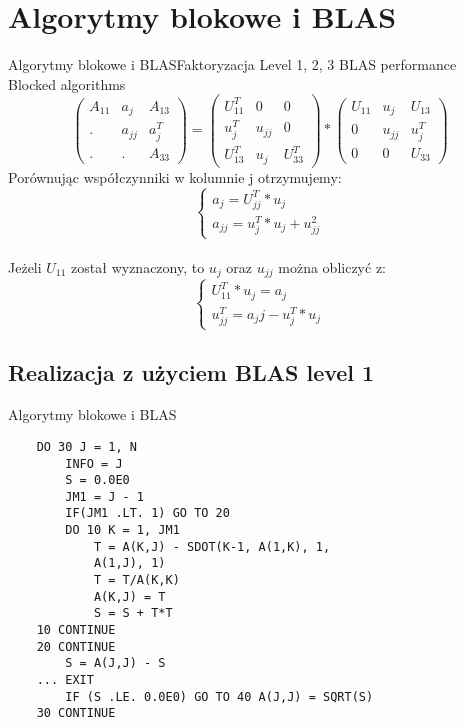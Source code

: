 \section{Algorytmy blokowe i BLAS}
	\begin{frame}{Algorytmy blokowe i BLAS}{Faktoryzacja}
		Level 1, 2, 3 BLAS performance \\
		Blocked algorithms \\
		$$
		\begin{pmatrix}
		A_{11} & a_j & A_{13} \\
		. & a_{jj} & a_j^T \\
		. & . & A_{33}
		\end{pmatrix}
		=
		\begin{pmatrix}
		U_{11}^T & 0 & 0 \\
		u_j^T & u_{jj} & 0 \\
		U_{13}^T & u_j & U_{33}^T
		\end{pmatrix}
		*
		\begin{pmatrix}
		U_{11} & u_j  & U_{13} \\
		0 & u_{jj} & u_j^T \\
		0 & 0 & U_{33}
		\end{pmatrix}
		$$
		Porównując współczynniki w kolumnie j otrzymujemy:
		$$
		\begin{cases}
		a_j = U_{jj}^T * u_j \\
		a_{jj} = u_j^T * u_j + u_{jj}^2
		\end{cases}
		$$ \\
		Jeżeli $U_{11}$ został wyznaczony, to $u_j$ oraz $u_{jj}$ można obliczyć z:
		$$
		\begin{cases}
		U_{11}^T * u_j = a_j \\
		u_{jj}^T = a_jj - u_j^T * u_{j}
		\end{cases}
		$$
	\end{frame}

	\subsection{Realizacja z użyciem BLAS level 1}

\begin{frame}[fragile]{Algorytmy blokowe i BLAS}
		\begin{lstlisting}
    DO 30 J = 1, N		
        INFO = J
        S = 0.0E0
        JM1 = J - 1
        IF(JM1 .LT. 1) GO TO 20
        DO 10 K = 1, JM1
            T = A(K,J) - SDOT(K-1, A(1,K), 1,
            A(1,J), 1)
            T = T/A(K,K)
            A(K,J) = T
            S = S + T*T
    10 CONTINUE
    20 CONTINUE
        S = A(J,J) - S
    ... EXIT
        IF (S .LE. 0.0E0) GO TO 40 A(J,J) = SQRT(S)
    30 CONTINUE		
		\end{lstlisting}
\end{frame}
	
